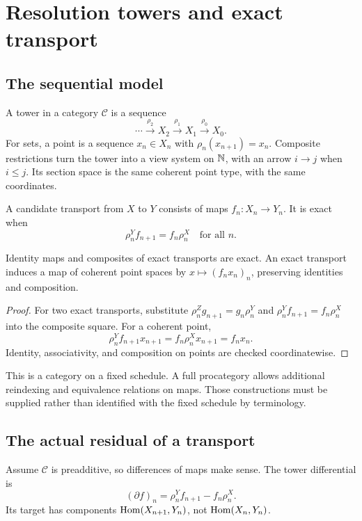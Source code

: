 \section{Resolution towers and exact transport}\label{sec:towers}
\subsection{The sequential model}
A tower in a category \(\mathcal C\) is a sequence
\[
 \cdots\xrightarrow{\rho_2}X_2\xrightarrow{\rho_1}X_1
 \xrightarrow{\rho_0}X_0.
\]
For sets, a point is a sequence \(x_n\in X_n\) with \(\rho_n(x_{n+1})=x_n\). Composite restrictions turn the tower into a view system on \(\mathbb N\), with an arrow \(i\to j\) when \(i\le j\). Its section space is the same coherent point type, with the same coordinates.

A candidate transport from \(X\) to \(Y\) consists of maps \(f_n:X_n\to Y_n\). It is exact when
\begin{equation}\label{eq:exacttower}
 \rho^Y_n f_{n+1}=f_n\rho^X_n\quad\text{for all }n.
\end{equation}

\begin{proposition}\label{KS16}
Identity maps and composites of exact transports are exact. An exact transport induces a map of coherent point spaces by \(x\mapsto(f_nx_n)_n\), preserving identities and composition.
\end{proposition}
\begin{proof}
For two exact transports, substitute \(\rho^Z_ng_{n+1}=g_n\rho^Y_n\) and \(\rho^Y_nf_{n+1}=f_n\rho^X_n\) into the composite square. For a coherent point,
\[
 \rho^Y_n f_{n+1}x_{n+1}
 =f_n\rho^X_nx_{n+1}=f_nx_n.
\]
Identity, associativity, and composition on points are checked coordinatewise.
\end{proof}
This is a category on a fixed schedule. A full procategory allows additional reindexing and equivalence relations on maps. Those constructions must be supplied rather than identified with the fixed schedule by terminology.

\subsection{The actual residual of a transport}
Assume \(\mathcal C\) is preadditive, so differences of maps make sense. The tower differential is
\[
 (\partial f)_n=\rho^Y_nf_{n+1}-f_n\rho^X_n.
\]
Its target has components \(\operatorname{Hom}(X_{n+1},Y_n)\), not \(\operatorname{Hom}(X_n,Y_n)\).

